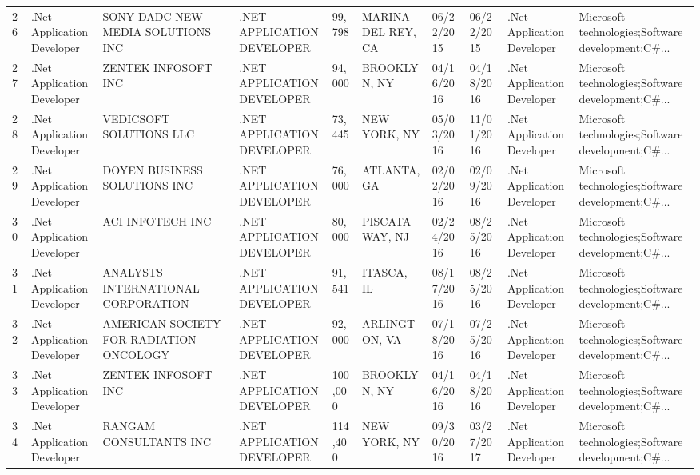\begin{table}[h!]
{\begin{tabular}{llllllllll}
	26 &  .Net Application Developer &                  SONY DADC NEW MEDIA SOLUTIONS INC &  .NET APPLICATION DEVELOPER &      99,798 &  MARINA DEL REY, CA &  06/22/2015 &  06/22/2015 &  .Net Application Developer &  Microsoft technologies;Software development;C\#... \\
	27 &  .Net Application Developer &                                ZENTEK INFOSOFT INC &  .NET APPLICATION DEVELOPER &      94,000 &        BROOKLYN, NY &  04/16/2016 &  04/18/2016 &  .Net Application Developer &  Microsoft technologies;Software development;C\#... \\
	28 &  .Net Application Developer &                            VEDICSOFT SOLUTIONS LLC &  .NET APPLICATION DEVELOPER &      73,445 &        NEW YORK, NY &  05/03/2016 &  11/01/2016 &  .Net Application Developer &  Microsoft technologies;Software development;C\#... \\
	29 &  .Net Application Developer &                       DOYEN BUSINESS SOLUTIONS INC &  .NET APPLICATION DEVELOPER &      76,000 &         ATLANTA, GA &  02/02/2016 &  02/09/2016 &  .Net Application Developer &  Microsoft technologies;Software development;C\#... \\
	30 &  .Net Application Developer &                                   ACI INFOTECH INC &  .NET APPLICATION DEVELOPER &      80,000 &      PISCATAWAY, NJ &  02/24/2016 &  08/25/2016 &  .Net Application Developer &  Microsoft technologies;Software development;C\#... \\
	31 &  .Net Application Developer &                 ANALYSTS INTERNATIONAL CORPORATION &  .NET APPLICATION DEVELOPER &      91,541 &          ITASCA, IL &  08/17/2016 &  08/25/2016 &  .Net Application Developer &  Microsoft technologies;Software development;C\#... \\
	32 &  .Net Application Developer &            AMERICAN SOCIETY FOR RADIATION ONCOLOGY &  .NET APPLICATION DEVELOPER &      92,000 &       ARLINGTON, VA &  07/18/2016 &  07/25/2016 &  .Net Application Developer &  Microsoft technologies;Software development;C\#... \\
	33 &  .Net Application Developer &                                ZENTEK INFOSOFT INC &  .NET APPLICATION DEVELOPER &     100,000 &        BROOKLYN, NY &  04/16/2016 &  04/18/2016 &  .Net Application Developer &  Microsoft technologies;Software development;C\#... \\
	34 &  .Net Application Developer &                             RANGAM CONSULTANTS INC &  .NET APPLICATION DEVELOPER &     114,400 &        NEW YORK, NY &  09/30/2016 &  03/27/2017 &  .Net Application Developer &  Microsoft technologies;Software development;C\#... \\

\end{tabular}}
\end{table}
